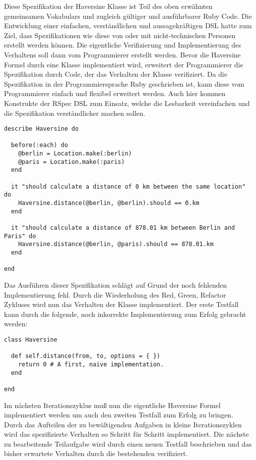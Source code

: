 Diese Spezifikation der Haversine Klasse ist Teil des oben erwähnten
gemeinsamen Vokabulars und zugleich gültiger und ausführbarer Ruby
Code. Die Entwicklung einer einfachen, verständlichen und
aussagekräftigen DSL hatte zum Ziel, dass Spezifikationen wie diese
von oder mit nicht-technischen Personen erstellt werden können. Die
eigentliche Verifizierung und Implementierung des Verhaltens soll dann
vom Programmierer erstellt werden. Bevor die Haversine Formel durch
eine Klasse implementiert wird, erweitert der Programmierer die
Spezifikation durch Code, der das Verhalten der Klasse verifiziert. Da
die Spezifikation in der Programmiersprache Ruby geschrieben ist, kann
diese vom Programmierer einfach und flexibel erweitert werden. Auch
hier kommen Konstrukte der RSpec DSL zum Einsatz, welche die
Lesbarkeit vereinfachen und die Spezifikation verständlicher machen
sollen.

\begin{lstlisting}
describe Haversine do

  before(:each) do
    @berlin = Location.make(:berlin)
    @paris = Location.make(:paris)
  end

  it "should calculate a distance of 0 km between the same location" do
    Haversine.distance(@berlin, @berlin).should == 0.km
  end

  it "should calculate a distance of 878.01 km between Berlin and Paris" do
    Haversine.distance(@berlin, @paris).should == 878.01.km
  end

end
\end{lstlisting}

Das Ausführen dieser Spezifikation schlägt auf Grund der noch
fehlenden Implementierung fehl. Durch die Wiederholung des Red, Green,
Refactor Zykluses wird nun das Verhalten der Klasse implementiert. Der
erste Testfall kann durch die folgende, noch inkorrekte
Implementierung zum Erfolg gebracht werden:

\begin{lstlisting}
class Haversine

  def self.distance(from, to, options = { })
    return 0 # A first, naive implementation.
  end

end
\end{lstlisting}

Im nächsten Iterationszyklus muß nun die eigentliche Haversine Formel
\cite{wiki:haversine} implementiert werden um auch den zweiten
Testfall zum Erfolg zu bringen. Durch das Aufteilen der zu
bewältigenden Aufgaben in kleine Iterationszyklen wird das
spezifizierte Verhalten so Schritt für Schritt implementiert. Die
nächste zu bearbeitende Teilaufgabe wird durch einen neuen Testfall
beschrieben und das bisher erwartete Verhalten durch die bestehenden
verifiziert.

